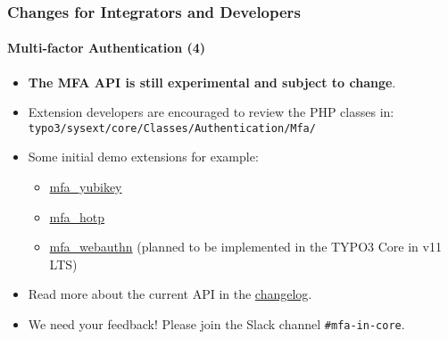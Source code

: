 %

\begin{frame}[fragile]
	\frametitle{Changes for Integrators and Developers}
	\framesubtitle{Multi-factor Authentication (4)}

	\begin{itemize}

		\item \textbf{The MFA API is still experimental and subject to change}.

		\item Extension developers are encouraged to review the PHP classes in:\newline
			\small\texttt{typo3/sysext/core/Classes/Authentication/Mfa/}\normalsize

		\item Some initial demo extensions for example:

			\begin{itemize}\small
				\item \href{https://github.com/derhansen/mfa_yubikey}{mfa\_yubikey}
				\item \href{https://github.com/o-ba/mfa_hotp}{mfa\_hotp}
				\item \href{https://github.com/bnf/mfa_webauthn}{mfa\_webauthn} (planned to be implemented in the TYPO3 Core in v11 LTS)
			\end{itemize}\normalsize

		\item Read more about the current API in the
			\href{https://docs.typo3.org/c/typo3/cms-core/master/en-us/Changelog/11.1/Feature-93526-MultiFactorAuthentication.rst}{changelog}.

		\item We need your feedback!\newline
			Please join the Slack channel \texttt{\#mfa-in-core}.

	\end{itemize}

\end{frame}


